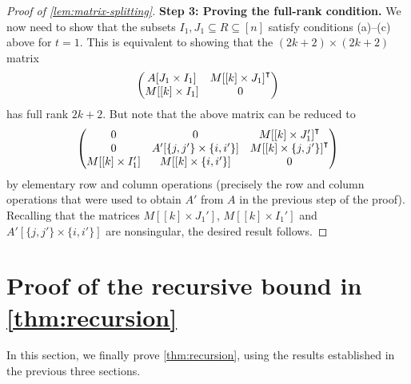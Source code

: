 \documentclass[english]{article}
\theoremstyle{remark}
\numberwithin{equation}{section}
\numberwithin{figure}{section}
\newcommand{\su}{\subseteq}
\begin{document}
\begin{proof}[Proof of \cref{lem:matrix-splitting}]
\textbf{Step 3: Proving the full-rank condition.} We now need to show that the subsets $I_1,J_1\su R\su [n]$ satisfy conditions (a)--(c) above for $t=1$. This is equivalent to showing that the $(2k+2)\times (2k+2)$ matrix
\[
\begin{pmatrix}A[J_{1}\times I_{1}] & M[[k]\times J_{1}]^{\transpose}\\
M[[k]\times I_{1}] & 0
\end{pmatrix}
\]
has full rank $2k+2$. But note that the above matrix can be reduced to 
\[
\begin{pmatrix}0 & 0 & M[[k]\times J_{1}']^{\transpose}\\
0 & A'[\{j,j'\}\times \{i,i'\}] & M[[k]\times \{j,j'\}]^{\transpose}\\
M[[k]\times I_{1}'] & M[[k]\times \{i,i'\}] & 0
\end{pmatrix}
\]
by elementary row and column operations (precisely the row and column operations that
were used to obtain $A'$ from $A$ in the previous step of the proof).
Recalling that the matrices $M[[k]\times J_{1}']$, $M[[k]\times I_{1}']$
and $A'[\{j,j'\}\times \{i,i'\}]$ are nonsingular, the desired
result follows.
\end{proof}

\section{Proof of the recursive bound in \texorpdfstring{\cref{thm:recursion}}{Theorem \ref{thm:recursion}}}\label{sec:recursion}

In this section, we finally prove \cref{thm:recursion}, using the results established in the previous three sections.
\end{document}
